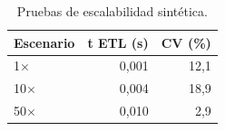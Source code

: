 \begin{table}[!t]
\centering
\caption{Pruebas de escalabilidad sint\'{e}tica.}
\label{tab:escala}
\small
\begin{tabular}{@{}lrr@{}}
\toprule
\textbf{Escenario} & \textbf{t ETL (s)} & \textbf{CV (\%)} \\
\midrule
1$\times$  & 0{,}001 & 12{,}1 \\
10$\times$ & 0{,}004 & 18{,}9 \\
50$\times$ & 0{,}010 &  2{,}9 \\
\bottomrule
\end{tabular}
\vspace{-2mm}
\end{table}
